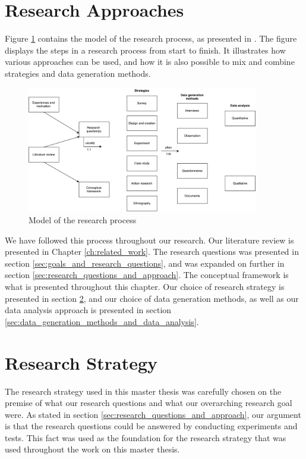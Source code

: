 
\section{Research Approaches}
Figure \ref{fig:model_research_process} contains the model of the research process, as presented in \citep{oates2005researching}. The figure displays the steps in a research process from start to finish. It illustrates how various approaches can be used, and how it is also possible to mix and combine strategies and data generation methods.

\begin{figure}[ht]
    \centering
    \includegraphics[width=0.9\textwidth]{fig/methodology/research_strategies.pdf}
    \caption{Model of the research process}
    \label{fig:model_research_process}
\end{figure}

We have followed this process throughout our research. Our literature review is presented in Chapter \ref{ch:related_work}. The research questions was presented in section \ref{sec:goals_and_research_questions}, and was expanded on further in section \ref{sec:research_questions_and_approach}. The conceptual framework is what is presented throughout this chapter. Our choice of research strategy is presented in section \ref{sec:research_strategy}, and our choice of data generation methods, as well as our data analysis approach is presented in section \ref{sec:data_generation_methods_and_data_analysis}.


\section{Research Strategy}
\label{sec:research_strategy}
The research strategy used in this master thesis was carefully chosen on the premise of what our research questions and what our overarching research goal were. As stated in section \ref{sec:research_questions_and_approach}, our argument is that the research questions could be answered by conducting experiments and tests. This fact was used as the foundation for the research strategy that was used throughout the work on this master thesis.

